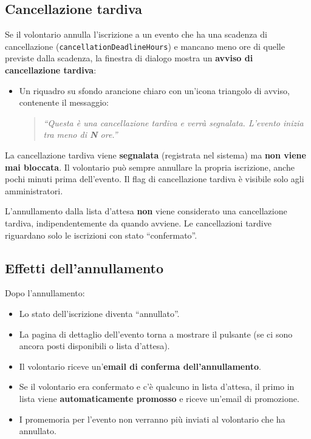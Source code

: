 \documentclass[a4paper,11pt,oneside]{book}
\newcommand{\campo}[1]{\texttt{#1}}
\newcommand{\pulsante}[1]{\fcolorbox{namoCharcoal}{namoGray}{\small\textsf{\textbf{#1}}}}
\begin{document}
\subsection{Cancellazione tardiva}

Se il volontario annulla l'iscrizione a un evento che ha una scadenza di cancellazione (\campo{cancellationDeadlineHours}) e mancano meno ore di quelle previste dalla scadenza, la finestra di dialogo mostra un \textbf{avviso di cancellazione tardiva}:

\begin{itemize}[leftmargin=1.5em]
  \item Un riquadro su sfondo arancione chiaro con un'icona triangolo di avviso, contenente il messaggio:
    \begin{quote}
    \textit{``Questa \`e una cancellazione tardiva e verr\`a segnalata. L'evento inizia tra meno di \textbf{N} ore.''}
    \end{quote}
\end{itemize}

\begin{warningbox}
La cancellazione tardiva viene \textbf{segnalata} (registrata nel sistema) ma \textbf{non viene mai bloccata}. Il volontario pu\`o sempre annullare la propria iscrizione, anche pochi minuti prima dell'evento. Il flag di cancellazione tardiva \`e visibile solo agli amministratori.
\end{warningbox}

\begin{tipbox}
L'annullamento dalla lista d'attesa \textbf{non} viene considerato una cancellazione tardiva, indipendentemente da quando avviene. Le cancellazioni tardive riguardano solo le iscrizioni con stato ``confermato''.
\end{tipbox}

\subsection{Effetti dell'annullamento}

Dopo l'annullamento:

\begin{itemize}[leftmargin=1.5em]
  \item Lo stato dell'iscrizione diventa ``annullato''.
  \item La pagina di dettaglio dell'evento torna a mostrare il pulsante \pulsante{Iscriviti} (se ci sono ancora posti disponibili o lista d'attesa).
  \item Il volontario riceve un'\textbf{email di conferma dell'annullamento}.
  \item Se il volontario era confermato e c'\`e qualcuno in lista d'attesa, il primo in lista viene \textbf{automaticamente promosso} e riceve un'email di promozione.
  \item I promemoria per l'evento non verranno pi\`u inviati al volontario che ha annullato.
\end{itemize}
\end{document}
